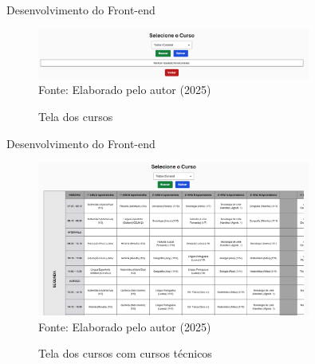 \begin{frame}{Desenvolvimento do Front-end}
    \begin{figure}
        \centering
        \vspace{-0.5cm}
        \caption{Tela dos cursos}
        \vspace{-0.2cm}
        \includegraphics[width=0.8\textwidth]{figuras/front-2.png}
        \\ %
        \small Fonte: Elaborado pelo autor (2025)
    \end{figure}
\end{frame}

\begin{frame}{Desenvolvimento do Front-end}
    \begin{figure}
        \centering
        \vspace{-0.5cm}
        \caption{Tela dos cursos com cursos técnicos}
        \vspace{-0.2cm}
        \includegraphics[width=0.8\textwidth]{figuras/front-3.png}
        \\ %
        \small Fonte: Elaborado pelo autor (2025)
    \end{figure}
\end{frame}

